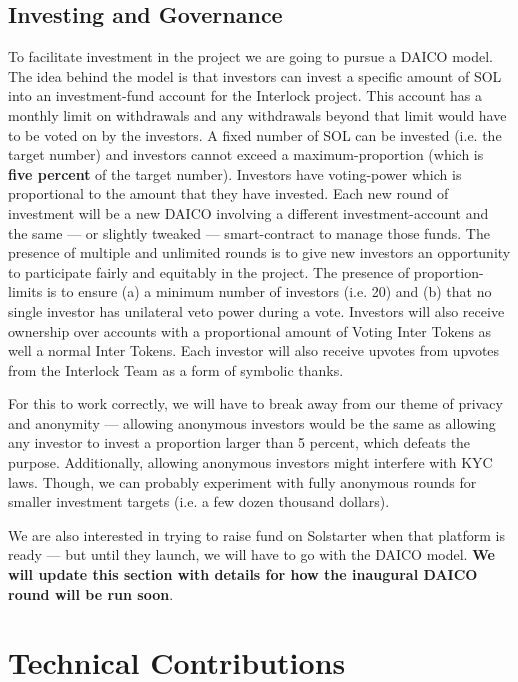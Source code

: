 \documentclass[a4paper]{article}
\begin{document}
\subsection{Investing and Governance}
\label{Investing and Governance}

To facilitate investment in the project we are going to pursue a DAICO model. The idea behind the model is that investors can invest a specific amount of SOL into an investment-fund account for the Interlock project. This account has a monthly limit on withdrawals and any withdrawals beyond that limit would have to be voted on by the investors. A fixed number of SOL can be invested (i.e. the target number) and investors cannot exceed a maximum-proportion (which is \textbf{five percent} of the target number). Investors have voting-power which is proportional to the amount that they have invested. Each new round of investment will be a new DAICO involving a different investment-account and the same ---  or slightly tweaked ---  smart-contract to manage those funds. The presence of multiple and unlimited rounds is to give new investors an opportunity to participate fairly and equitably in the project. The presence of proportion-limits is to ensure (a) a minimum number of investors (i.e. 20) and (b) that no single investor has unilateral veto power during a vote. Investors will also receive ownership over accounts with a proportional amount of Voting Inter Tokens as well a normal Inter Tokens. Each investor will also receive upvotes from upvotes from the Interlock Team as a form of symbolic thanks.

For this to work correctly, we will have to break away from our theme of privacy and anonymity ---  allowing anonymous investors would be the same as allowing any investor to invest a proportion larger than 5 percent, which defeats the purpose. Additionally, allowing anonymous investors might interfere with KYC laws. Though, we can probably experiment with fully anonymous rounds for smaller investment targets (i.e. a few dozen thousand dollars).

We are also interested in trying to raise fund on Solstarter when that platform is ready ---  but until they launch, we will have to go with the DAICO model. \textbf{We will update this section with details for how the inaugural DAICO round will be run soon}.
\section{Technical Contributions}
\label{Technical Contributions}
\end{document}
